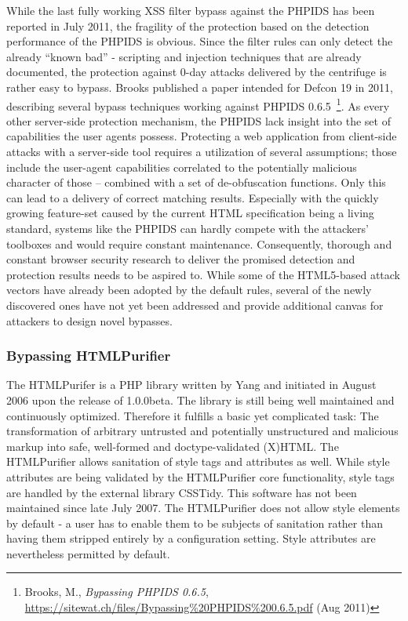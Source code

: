       While the last fully working XSS filter bypass against the PHPIDS has been reported in July 2011, the fragility of the protection based on the detection performance of the PHPIDS is obvious. Since the filter rules can only detect the already ``known bad'' - scripting and injection techniques that are already documented, the protection against 0-day attacks delivered by the centrifuge is rather easy to bypass. Brooks published a paper intended for Defcon 19 in 2011, describing several bypass techniques working against PHPIDS 0.6.5~\footnote{Brooks, M., \textit{Bypassing PHPIDS 0.6.5}, \url{https://sitewat.ch/files/Bypassing\%20PHPIDS\%200.6.5.pdf} (Aug 2011)}. As every other server-side protection mechanism, the PHPIDS lack insight into the set of capabilities the user agents possess. Protecting a web application from client-side attacks with a server-side tool requires a utilization of several assumptions; those include the user-agent capabilities correlated to the potentially malicious character of 
those -- combined with a set of de-obfuscation functions. Only this can lead to a delivery of correct matching results. Especially with the quickly growing feature-set caused by the current HTML specification being a living standard, systems like the PHPIDS can hardly compete with the attackers' toolboxes and would require constant maintenance. Consequently, thorough and constant browser security research to deliver the promised detection and protection results needs to be aspired to. While some of the HTML5-based attack vectors have already been adopted by the default rules, several of the newly discovered ones have not yet been addressed and provide additional canvas for attackers to design novel bypasses.

      \subsubsection{Bypassing HTMLPurifier}
      \label{subsubsubsec:5.4.6.2.bypassing_htmlpurifier}

      The HTMLPurifer is a PHP library written by Yang and initiated in August 2006 upon the release of 1.0.0beta. The library is still being well maintained and continuously optimized. Therefore it fulfills a basic yet complicated task: The transformation of arbitrary untrusted and potentially unstructured and malicious markup into safe, well-formed and doctype-validated (X)HTML. The HTMLPurifier allows sanitation of style tags and attributes as well. While style attributes are being validated by the HTMLPurifier core functionality, style tags are handled by the external library CSSTidy. This software has not been maintained since late July 2007. The HTMLPurifier does not allow style elements by default - a user has to enable them to be subjects of sanitation rather than having them stripped entirely by a configuration setting. Style attributes are nevertheless permitted by default. \\

